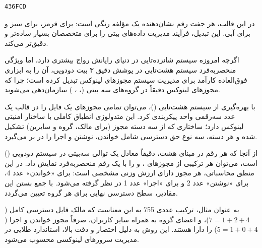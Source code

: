 \begin{latin}
\begin{lstlisting}
436FCD
\end{lstlisting}
\end{latin}

در این قالب، هر جفت رقم  نشان‌دهنده یک مؤلفه رنگی است:  برای قرمز،  برای سبز و  برای آبی. این تبدیل، فرآیند مدیریت داده‌های بیتی را برای متخصصان بسیار ساده‌تر و دقیق‌تر می‌کند.

اگرچه امروزه سیستم شانزده‌تایی در دنیای رایانش رواج بیشتری دارد، اما ویژگی منحصربه‌فرد سیستم هشت‌تایی در پوشش دقیق ۳ بیت دودویی، آن را به ابزاری فوق‌العاده کارآمد برای مدیریت سیستم مجوزهای لینوکس تبدیل کرده است؛ چرا که مجوزهای لینوکس دقیقاً در گروه‌های سه بیتی (، ، ) سازمان‌دهی می‌شوند.

با بهره‌گیری از سیستم هشت‌تایی ()، می‌توان تمامی مجوزهای یک فایل را در قالب یک عدد سه‌رقمی واحد پیکربندی کرد. این متدولوژی انطباق کاملی با ساختار امنیتی لینوکس دارد؛ ساختاری که از سه دسته مجوز (برای مالک، گروه و سایرین) تشکیل شده و هر دسته، سه نوع حق دسترسی شامل خواندن، نوشتن و اجرا را در بر می‌گیرد.

از آنجا که هر رقم در مبنای هشت، دقیقاً معادل یک توالی سه‌بیتی در سیستم دودویی () است، می‌توان هر ترکیبی از مجوزهای ،  و  را با یک رقم منحصربه‌فرد نمایش داد. در این منطق محاسباتی، هر مجوز دارای ارزش وزنی مشخصی است: برای «خواندن» عدد 4، برای «نوشتن» عدد 2 و برای «اجرا» عدد 1 در نظر گرفته می‌شود. با جمع بستن این مقادیر، سطح دسترسی نهایی برای هر گروه تعیین می‌گردد.

به عنوان مثال، ترکیب عددی 755 به این معناست که مالک فایل دسترسی کامل ($7=1+2+4$)، و اعضای گروه به همراه سایر کاربران، صرفاً مجوز خواندن و اجرا ($5=1+0+4$) را دارا هستند. این روش به دلیل اختصار و دقت بالا، استاندارد طلایی در مدیریت سرورهای لینوکسی محسوب می‌شود.

